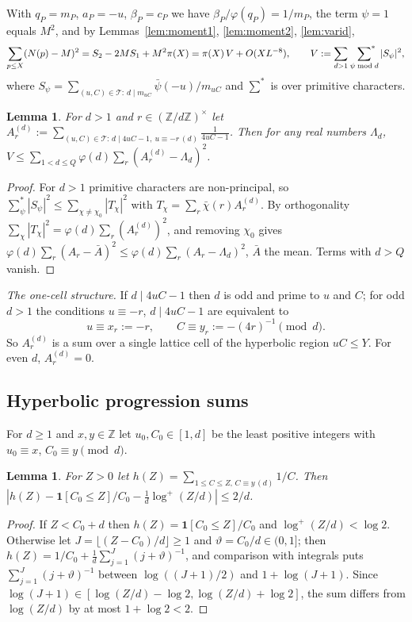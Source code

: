 \documentclass[11pt,reqno]{amsart}
\newtheorem{lemma}[theorem]{Lemma}
\theoremstyle{definition}
\newcommand{\Z}{\mathbb Z}
\newcommand{\cT}{\mathcal T}
\begin{document}
With $q_P=m_P$, $a_P=-u$, $\beta_P=c_P$ we have $\beta_P/\varphi(q_P)=1/m_P$,
the term $\psi=1$ equals $M^2$, and by Lemmas~\ref{lem:moment1},
\ref{lem:moment2}, \ref{lem:varid},
\begin{equation}\label{eq:var}
 \sum_{p\le X}(N(p)-M)^2=S_2-2MS_1+M^2\pi(X)=\pi(X)\,V+O(XL^{-8}),
 \qquad V:=\sum_{d>1}\ \sideset{}{^*}\sum_{\psi\bmod d}|S_\psi|^2,
\end{equation}
where $S_\psi=\sum_{(u,C)\in\cT:\,d\mid m_{uC}}\bar\psi(-u)/m_{uC}$ and
$\sum^*$ is over primitive characters.

\begin{lemma}\label{lem:parseval}
For $d>1$ and $r\in(\Z/d\Z)^\times$ let
$A_r^{(d)}:=\sum_{(u,C)\in\cT:\,d\mid 4uC-1,\ u\equiv-r\,(d)}\frac1{4uC-1}$.
Then for any real numbers $\Lambda_d$,
$V\le\sum_{1<d\le Q}\varphi(d)\sum_{r}(A^{(d)}_r-\Lambda_d)^2$.
\end{lemma}
\begin{proof}
For $d>1$ primitive characters are non-principal, so
$\sum^*_\psi|S_\psi|^2\le\sum_{\chi\ne\chi_0}|T_\chi|^2$ with
$T_\chi=\sum_r\bar\chi(r)A_r^{(d)}$.  By orthogonality
$\sum_{\chi}|T_\chi|^2=\varphi(d)\sum_r(A_r^{(d)})^2$, and removing $\chi_0$
gives $\varphi(d)\sum_r(A_r-\bar A)^2\le\varphi(d)\sum_r(A_r-\Lambda_d)^2$,
$\bar A$ the mean.  Terms with $d>Q$ vanish.
\end{proof}

\emph{The one-cell structure.}  If $d\mid4uC-1$ then $d$ is odd and
prime to $u$ and $C$; for odd $d>1$ the conditions $u\equiv-r$, $d\mid
4uC-1$ are equivalent to
\[
 u\equiv x_r:=-r,\qquad C\equiv y_r:=-(4r)^{-1}\pmod d .
\]
So $A^{(d)}_r$ is a sum over a single lattice cell of the hyperbolic
region $uC\le Y$.  For even $d$, $A^{(d)}_r=0$.

\subsection{Hyperbolic progression sums}
For $d\ge1$ and $x,y\in\Z$ let $u_0,C_0\in[1,d]$ be the least positive
integers with $u_0\equiv x$, $C_0\equiv y\pmod d$.

\begin{lemma}\label{lem:hyp1}
For $Z>0$ let $h(Z)=\sum_{1\le C\le Z,\,C\equiv y\,(d)}1/C$.  Then
$|h(Z)-\mathbf 1[C_0\le Z]/C_0-\frac1d\log^+(Z/d)|\le2/d$.
\end{lemma}
\begin{proof}
If $Z<C_0+d$ then $h(Z)=\mathbf 1[C_0\le Z]/C_0$ and $\log^+(Z/d)<\log2$.
Otherwise let $J=\lfloor(Z-C_0)/d\rfloor\ge1$ and $\vartheta=C_0/d\in(0,1]$;
then $h(Z)=1/C_0+\frac1d\sum_{j=1}^J(j+\vartheta)^{-1}$, and comparison with
integrals puts $\sum_{j=1}^J(j+\vartheta)^{-1}$ between $\log((J+1)/2)$
and $1+\log(J+1)$.  Since $\log(J+1)\in[\log(Z/d)-\log2,\log(Z/d)+\log2]$,
the sum differs from $\log(Z/d)$ by at most $1+\log2<2$.
\end{proof}
\end{document}
